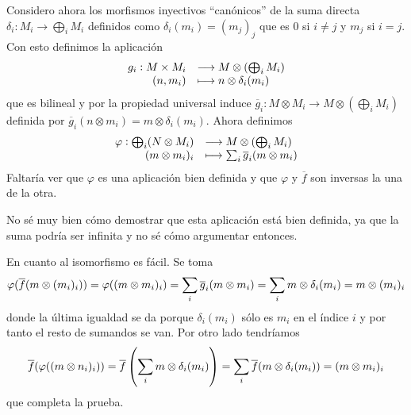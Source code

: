 \documentclass[../../../main.tex]{subfiles}
\begin{document}
\begin{sol}
\begin{enumerate}[(i)]
    Considero ahora los morfismos inyectivos ``canónicos'' de la suma directa $\delta_i:M_i\to \bigoplus_iM_i$ definidos como $\delta_i(m_i) = (m_j)_j$ que es 0 si $i\not=j$ y $m_j$ si $i = j$. Con esto definimos la aplicación
    \begin{equation}
        \notag
        \begin{array}{rl}
            g_i:M\times M_i & \longrightarrow M\otimes(\bigoplus_iM_i) \\
            (n,m_i) & \longmapsto n\otimes\delta_i(m_i)
        \end{array}
    \end{equation}
    que es bilineal y por la propiedad universal induce $\overline{g}_i:M\otimes M_i\to M\otimes(\bigoplus_iM_i)$ definida por $\overline{g}_i(n\otimes m_i) = m\otimes \delta_i(m_i)$. Ahora definimos
    \begin{equation}
        \notag
        \begin{array}{rl}
            \varphi:\bigoplus_i(N\otimes M_i) & \longrightarrow M\otimes(\bigoplus_iM_i) \\
            (m\otimes m_i)_i & \longmapsto \sum_i \overline{g}_i(m\otimes m_i)
        \end{array}
    \end{equation}
    Faltaría ver que $\varphi$ es una aplicación bien definida y que $\varphi$ y $\overline{f}$ son inversas la una de la otra.
    
    No sé muy bien cómo demostrar que esta aplicación está bien definida, ya que la suma podría ser infinita y no sé cómo argumentar entonces. 
    
    En cuanto al isomorfismo es fácil. Se toma
    \begin{equation}
        \notag
        \varphi(\overline{f}(m\otimes(m_i)_i)) = \varphi((m\otimes m_i)_i) = \sum_i\overline{g}_i(m\otimes m_i) = \sum_im\otimes \delta_i(m_i) = m\otimes (m_i)_i
    \end{equation}
    donde la última igualdad se da porque $\delta_i(m_i)$ sólo es $m_i$ en el índice $i$ y por tanto el resto de sumandos se van. Por otro lado tendríamos
    \begin{equation}
        \notag
        \overline{f}(\varphi((m\otimes n_i)_i)) = \overline{f}\left(\sum_im\otimes \delta_i(m_i)\right) = \sum_i\overline{f}(m\otimes\delta_i(m_i)) = (m\otimes m_i)_i
    \end{equation}
    que completa la prueba.
    
    
    

\end{enumerate}
\end{sol}
\end{document}
